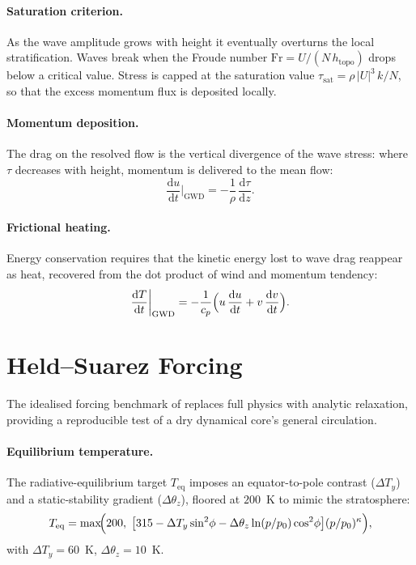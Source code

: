 \documentclass[11pt,twoside]{report}
\newcommand{\dd}{\mathrm{d}}
\newcommand{\cpd}{c_p}
\newcommand{\pref}{p_0}
\begin{document}
\paragraph{Saturation criterion.}
As the wave amplitude grows with height it eventually overturns the local
stratification. Waves break when the Froude number
$\mathrm{Fr}=U/(N\,h_{\mathrm{topo}})$ drops below a critical value.  Stress is
capped at the saturation value $\tau_{\mathrm{sat}}=\rho\,|U|^3\,k/N$, so that
the excess momentum flux is deposited locally.

\paragraph{Momentum deposition.}
The drag on the resolved flow is the vertical divergence of the wave stress:
where $\tau$ decreases with height, momentum is delivered to the mean flow:
\begin{equation}
  \frac{\dd u}{\dd t}\bigg|_{\mathrm{GWD}} = -\frac{1}{\rho}\,
  \frac{\dd\tau}{\dd z}.
\end{equation}

\paragraph{Frictional heating.}
Energy conservation requires that the kinetic energy lost to wave drag reappear
as heat, recovered from the dot product of wind and momentum tendency:
\begin{equation}
  \frac{\dd T}{\dd t}\bigg|_{\mathrm{GWD}} =
  -\frac{1}{\cpd}\Bigl(u\,\frac{\dd u}{\dd t}+v\,\frac{\dd v}{\dd t}\Bigr).
\end{equation}


\section{Held--Suarez Forcing}
\label{sec:held-suarez}

The idealised forcing benchmark of \citet{HeldSuarez1994} replaces full
physics with analytic relaxation, providing a reproducible test of a dry
dynamical core's general circulation.

\paragraph{Equilibrium temperature.}
The radiative-equilibrium target $T_{\mathrm{eq}}$ imposes an equator-to-pole
contrast ($\Delta T_y$) and a static-stability gradient ($\Delta\theta_z$),
floored at $200$~K to mimic the stratosphere:
\begin{equation}
  T_{\mathrm{eq}} = \max\!\Bigl(200,\;
  \bigl[315-\Delta T_y\sin^2\!\phi
  - \Delta\theta_z\ln(p/\pref)\cos^2\!\phi\bigr]
  (p/\pref)^\kappa\Bigr),
\end{equation}
with $\Delta T_y=60$~K, $\Delta\theta_z=10$~K.
\end{document}
